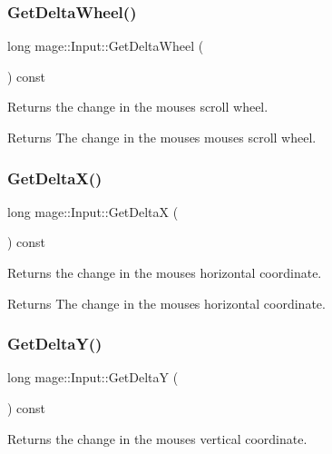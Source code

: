\subsubsection{\texorpdfstring{Get\+Delta\+Wheel()}{GetDeltaWheel()}}
{\footnotesize\ttfamily long mage\+::\+Input\+::\+Get\+Delta\+Wheel (\begin{DoxyParamCaption}{ }\end{DoxyParamCaption}) const}

Returns the change in the mouse\textquotesingle{}s scroll wheel.

\begin{DoxyReturn}{Returns}
The change in the mouse\textquotesingle{}s mouse\textquotesingle{}s scroll wheel. 
\end{DoxyReturn}
\hypertarget{classmage_1_1_input_a6fcfe61fc9f5a2575375c7e2c39507f5}{}\label{classmage_1_1_input_a6fcfe61fc9f5a2575375c7e2c39507f5} 
\subsubsection{\texorpdfstring{Get\+Delta\+X()}{GetDeltaX()}}
{\footnotesize\ttfamily long mage\+::\+Input\+::\+Get\+DeltaX (\begin{DoxyParamCaption}{ }\end{DoxyParamCaption}) const}

Returns the change in the mouse\textquotesingle{}s horizontal coordinate.

\begin{DoxyReturn}{Returns}
The change in the mouse\textquotesingle{}s horizontal coordinate. 
\end{DoxyReturn}
\hypertarget{classmage_1_1_input_ac63b55db4438989d2c6729a358ace296}{}\label{classmage_1_1_input_ac63b55db4438989d2c6729a358ace296} 
\subsubsection{\texorpdfstring{Get\+Delta\+Y()}{GetDeltaY()}}
{\footnotesize\ttfamily long mage\+::\+Input\+::\+Get\+DeltaY (\begin{DoxyParamCaption}{ }\end{DoxyParamCaption}) const}

Returns the change in the mouse\textquotesingle{}s vertical coordinate.

